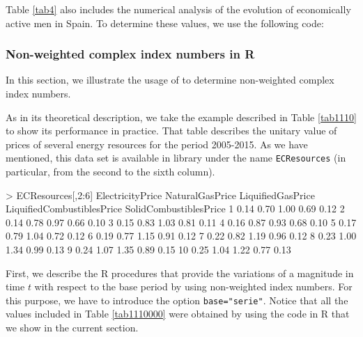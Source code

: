 Table \ref{tab4} also includes the numerical analysis of the evolution of  economically active men in Spain. To determine these values, we use the following code:


\subsubsection{Non-weighted complex index numbers in R}

In this section, we illustrate the usage of  to determine non-weighted complex index numbers. 

As in its theoretical description, we take the example described in Table \ref{tab1110} to show its performance in practice. That table describes the unitary value of prices of several energy resources for the period 2005-2015. As we have mentioned, this data set is available in library  under the name \verb|ECResources| (in particular, from the second to the sixth column).
\begin{example}[fontsize=\footnotesize]
> ECResources[,2:6]
   ElectricityPrice NaturalGasPrice LiquifiedGasPrice LiquifiedCombustiblesPrice SolidCombustiblesPrice
1              0.14            0.70              1.00                       0.69                   0.12
2              0.14            0.78              0.97                       0.66                   0.10
3              0.15            0.83              1.03                       0.81                   0.11
4              0.16            0.87              0.93                       0.68                   0.10
5              0.17            0.79              1.04                       0.72                   0.12
6              0.19            0.77              1.15                       0.91                   0.12
7              0.22            0.82              1.19                       0.96                   0.12
8              0.23            1.00              1.34                       0.99                   0.13
9              0.24            1.07              1.35                       0.89                   0.15
10             0.25            1.04              1.22                       0.77                   0.13
\end{example}

\vspace*{0.5 cm}First, we describe the R procedures that provide the variations of a magnitude in time $t$ with respect to the base period by using non-weighted index numbers. For this purpose, we have to introduce the option \verb|base="serie"|. Notice that all the values included in Table \ref{tab1110000} were obtained by using the code in R that we show in the current section.

